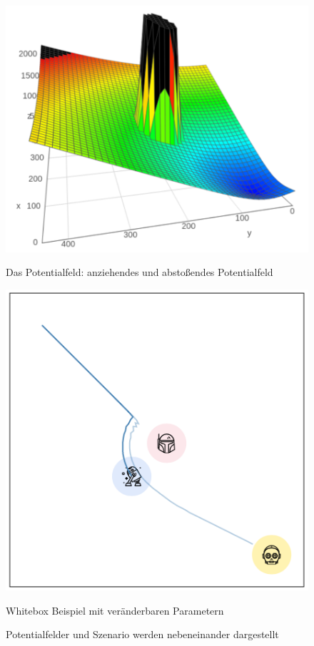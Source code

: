 \begin{figure}
\centering
\begin{minipage}[t]{.48\textwidth}
\centering
\includegraphics[width=0.8\linewidth, height=0.8\linewidth]{img/pot.png}
\caption{Das Potentialfeld: anziehendes und abstoßendes Potentialfeld}\label{fig:surf_pot}
\end{minipage}\hfill
\begin{minipage}[t]{.48\textwidth}
\centering
\includegraphics[width=0.8\linewidth, height=0.8\linewidth]{img/sim1b.png}
\caption{Whitebox Beispiel mit veränderbaren Parametern}\label{fig:sw_whitebox}
\end{minipage}
\caption{Potentialfelder und Szenario werden nebeneinander dargestellt}
\label{fig:combi}
\end{figure}

